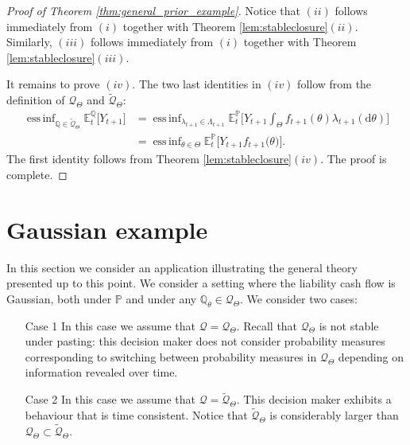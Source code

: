 \documentclass[11pt,a4paper]{article}
\newcommand{\E}{\mathbb{E}}
\DeclareMathOperator*{\essinf}{ess\,inf}
\renewcommand{\P}{\mathbb{P}}
\newcommand{\Q}{\mathbb{Q}}
\newcommand{\calQ}{\mathcal{Q}}
\begin{document}
\begin{proof}[Proof of Theorem \ref{thm:general_prior_example}]
Notice that $(ii)$ follows immediately from $(i)$ together with Theorem \ref{lem:stableclosure}$(ii)$. 
Similarly, $(iii)$ follows immediately from $(i)$ together with Theorem \ref{lem:stableclosure}$(iii)$.  

It remains to prove $(iv)$. 
The two last identities in $(iv)$ follow from the definition of $\calQ_{\Theta}$ and $\widetilde{\calQ}_{\Theta}$:
\begin{align*}
\essinf_{\Q \in \widetilde{\calQ}_{\Theta}}\E^\Q_t\big[Y_{t+1}\big]
&=\essinf_{\lambda_{t+1} \in \Lambda_{t+1}}\E^\P_t\bigg[Y_{t+1}\int_{\Theta}f_{t+1}(\theta)\lambda_{t+1}(\mathrm{d} \theta)\bigg]\\
&=\essinf_{\theta  \in \Theta} \E^\P_t \big[Y_{t+1} f_{t+1}\big(\theta\big)\big].
\end{align*}
The first identity follows from Theorem \ref{lem:stableclosure}$(iv)$. The proof is complete.    
\end{proof}


\section{Gaussian example}\label{sec:gaussian_example}

In this section we consider an application illustrating the general theory presented up to this point. 
We consider a setting where the liability cash flow is Gaussian, both under $\P$ and under any $\Q_{\theta}\in\calQ_{\Theta}$. 
We consider two cases:
\begin{itemize}
\item[Case 1]
In this case we assume that $\calQ=\calQ_{\Theta}$. Recall that $\calQ_{\Theta}$ is not stable under pasting: this decision maker does not consider probability measures corresponding to switching between probability measures in $\calQ_{\Theta}$ depending on information revealed over time. 
\item[Case 2]
In this case we assume that $\calQ=\widetilde{\calQ}_{\Theta}$. This decision maker exhibits a behaviour that is time consistent. Notice that $\widetilde{\calQ}_{\Theta}$ is considerably larger than $\calQ_{\Theta}\subset \widetilde{\calQ}_{\Theta}$. 
\end{itemize}
\end{document}
